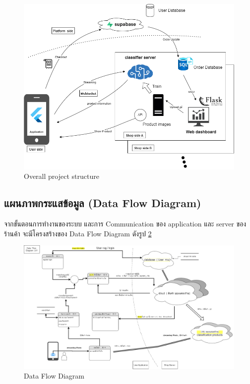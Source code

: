\begin{figure}[h]
  \begin{center}
  
  \vspace{0.5cm}\includegraphics[scale=0.3]{pic/overall_2.png}
  \end{center}
  
  \caption[Overall project structure]{Overall project structure}
  \label{fig:Overall project structure}
  \end{figure}

  \newpage
  \subsection{แผนภาพกระแสข้อมูล (Data Flow Diagram)}
 จากขั้นตอนการทำงานของระบบ  และการ Communication ของ application และ server ของร้านค้า  
 จะมีโครงสร้างของ Data Flow Diagram ดังรูป \ref{fig:Data Flow Diagram}
\begin{figure}[h]
  \begin{center}
   
  \includegraphics[scale=0.25]{pic/dataflow-lv0.png}
  \end{center}
  
  \caption[Data Flow Diagram]{Data Flow Diagram}
  \label{fig:Data Flow Diagram}
  \end{figure}

